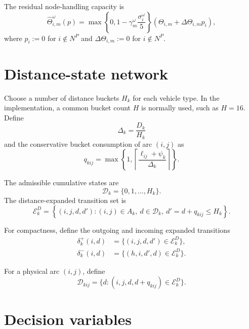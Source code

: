 \documentclass[11pt]{article}
\begin{document}
The residual node-handling capacity is
\begin{equation}
\widehat\Theta^\omega_{i,m}(p)
=
\max\left\{0,1-\gamma^\omega_m\frac{\sigma^\omega_i}{5}\right\}
\left(\Theta_{i,m}+\Delta\Theta_{i,m}p_i\right),
\label{eq:handling-capacity}
\end{equation}
where $p_i:=0$ for $i\notin N^P$ and
$\Delta\Theta_{i,m}:=0$ for $i\notin N^P$.

\section{Distance-state network}

Choose a number of distance buckets $H_k$ for each vehicle type.  In the
implementation, a common bucket count $H$ is normally used, such as $H=16$.
Define
\begin{equation}
\Delta_k=\frac{D_k}{H_k}
\label{eq:bucket-width}
\end{equation}
and the conservative bucket consumption of arc $(i,j)$ as
\begin{equation}
q_{kij}
=
\max\left\{1,
\left\lceil
\frac{\ell_{ij}+\psi_k}{\Delta_k}
\right\rceil
\right\}.
\label{eq:bucket-consumption}
\end{equation}

The admissible cumulative states are
\begin{equation}
\mathcal D_k=\{0,1,\ldots,H_k\}.
\end{equation}
The distance-expanded transition set is
\begin{equation}
\mathcal E_k^D
=
\left\{
(i,j,d,d'):
(i,j)\in A_k,\ d\in\mathcal D_k,\
d'=d+q_{kij}\leq H_k
\right\}.
\label{eq:expanded-arcs}
\end{equation}

For compactness, define the outgoing and incoming expanded transitions
\begin{align}
\delta_k^+(i,d)
&=
\{(i,j,d,d')\in\mathcal E_k^D\},\\
\delta_k^-(i,d)
&=
\{(h,i,d',d)\in\mathcal E_k^D\}.
\end{align}

For a physical arc $(i,j)$, define
\begin{equation}
\mathcal D_{kij}
=
\{d:(i,j,d,d+q_{kij})\in\mathcal E_k^D\}.
\end{equation}

\section{Decision variables}
\end{document}
